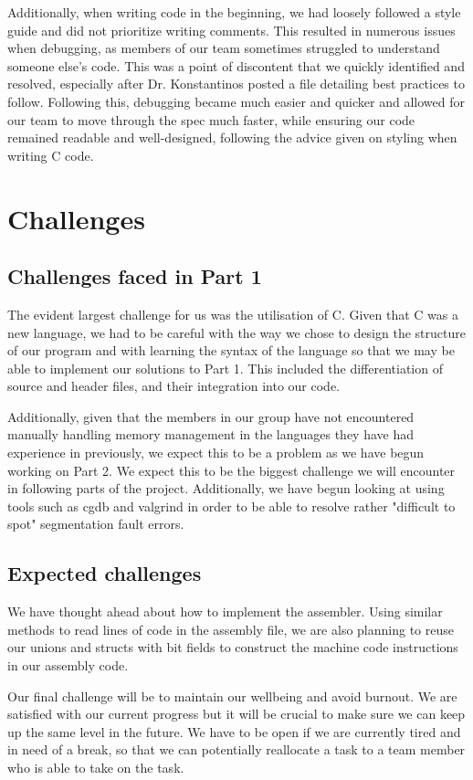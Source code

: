 \documentclass[11pt, a4paper]{article}
\begin{document}
  Additionally, when writing code in the beginning, we had loosely followed a style guide and did not prioritize writing comments. This resulted in numerous issues when debugging, as members of our team sometimes struggled to understand someone else's code. This was a point of discontent that we quickly identified and resolved, especially after Dr. Konstantinos posted a file detailing best practices to follow. Following this, debugging became much easier and quicker and allowed for our team to move through the spec much faster, while ensuring our code remained readable and well-designed, following the advice given on styling when writing C code.
  \vspace{-0.5cm}
  \section{Challenges}
  \subsection{Challenges faced in Part 1}
  The evident largest challenge for us was the utilisation of C. Given that C was a new language, we had to be careful with the way we chose to design the structure of our program and with learning the syntax of the language so that we may be able to implement our solutions to Part 1. This included the differentiation of source and header files, and their integration into our code.

  Additionally, given that the members in our group have not encountered manually handling memory management in the languages they have had experience in previously, we expect this to be a problem as we have begun working on Part 2. We expect this to be the biggest challenge we will encounter in following parts of the project. Additionally, we have begun looking at using tools such as cgdb and valgrind in order to be able to resolve rather "difficult to spot" segmentation fault errors.


  \subsection{Expected challenges}
  We have thought ahead about how to implement the assembler. Using similar methods to read lines of code in the assembly file, we are also planning to reuse our unions and structs with bit fields to construct the machine code instructions in our assembly code.

  Our final challenge will be to maintain our wellbeing and avoid burnout. We are satisfied with our current progress but it will be crucial to make sure we can keep up the same level in the future. We have to be open if we are currently tired and in need of a break, so that we can potentially reallocate a task to a team member who is able to take on the task.

  
\end{document}
